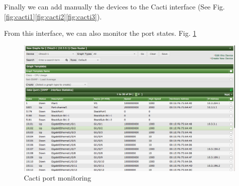 \documentclass[10pt,a4paper]{article}
\begin{document}
Finally we can add manually the devices to the Cacti interface (See Fig. \ref{fig:cacti1}\ref{fig:cacti2}\ref{fig:cacti3}).

\begin{figure}[H]
\hfill
\hfill
\hfill
\end{figure}

From this interface, we can also monitor the port states. Fig. \ref{fig:cacti-ports-monitoring}

\begin{figure}[H]
	\centering
		\includegraphics[scale=0.38]{figures/Cacti-ports.png}
		\caption{Cacti port monitoring}
	\label{fig:cacti-ports-monitoring}
\end{figure}
\end{document}
